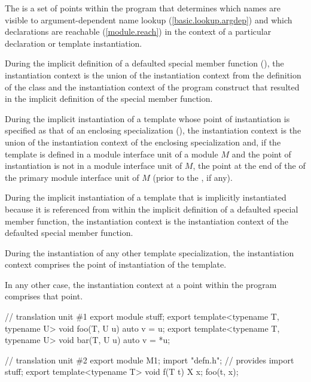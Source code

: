 \begin{std.txt}\color{addclr}
\pnum
The  is a set of points within the program
that determines which names are visible to argument-dependent name lookup
(\ref{basic.lookup.argdep})
and which declarations are reachable (\ref{module.reach})
in the context of a particular declaration or template instantiation.

\pnum
During the implicit definition of a defaulted special member function
(),
the instantiation context is the union of
the instantiation context from the definition of the class and
the instantiation context of the program construct that
resulted in the implicit definition of the special member function.

\pnum
During the implicit instantiation of a template
whose point of instantiation is specified as
that of an enclosing specialization (),
the instantiation context is the union of
the instantiation context of the enclosing specialization and,
if the template is defined in a module interface unit of a module $M$
and the point of instantiation is not in a module interface unit of $M$,
the point at the end of the
 of the
primary module interface unit of $M$
(prior to the , if any).

\pnum
During the implicit instantiation of a template
that is implicitly instantiated because it is referenced
from within the implicit definition of a defaulted special member function,
the instantiation context is the instantiation context of
the defaulted special member function.

\pnum
During the instantiation of any other template specialization,
the instantiation context comprises the point of instantiation
of the template.

\pnum
In any other case, the instantiation context
at a point within the program
comprises that point.

\pnum
\begin{example}
\begin{codeblock}
// translation unit \#1
export module stuff;
export template<typename T, typename U> void foo(T, U u) { auto v = u; }
export template<typename T, typename U> void bar(T, U u) { auto v = *u; }

// translation unit \#2
export module M1;
import "defn.h";        // provides 
import stuff;
export template<typename T> void f(T t) {
 X x;
 foo(t, x);
}


\end{codeblock}
\end{example}
\end{std.txt}
